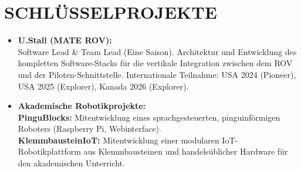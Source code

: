\documentclass[10pt,a4paper]{article}
\begin{document}
\begin{minipage}[t]{0.30\textwidth}
    \section*{SCHLÜSSELPROJEKTE}
    \begin{itemize}
        \item \textbf{U.Stall (MATE ROV):}\\
        Software Lead \& Team Lead (Eine Saison). Architektur und Entwicklung des kompletten Software-Stacks für die vertikale Integration zwischen dem ROV und der Piloten-Schnittstelle. Internationale Teilnahme: USA 2024 (Pioneer), USA 2025 (Explorer), Kanada 2026 (Explorer).
        \vspace{0.4em}
        \item \textbf{Akademische Robotikprojekte:}\\
        \textbf{PinguBlocks:} Mitentwicklung eines sprachgesteuerten, pinguinförmigen Roboters (Raspberry Pi, Webinterface).\\
        \textbf{KlemmbausteinIoT:} Mitentwicklung einer modularen IoT-Robotikplattform aus Klemmbausteinen und handelsüblicher Hardware für den akademischen Unterricht.
    \end{itemize}

\end{minipage}
\end{document}
